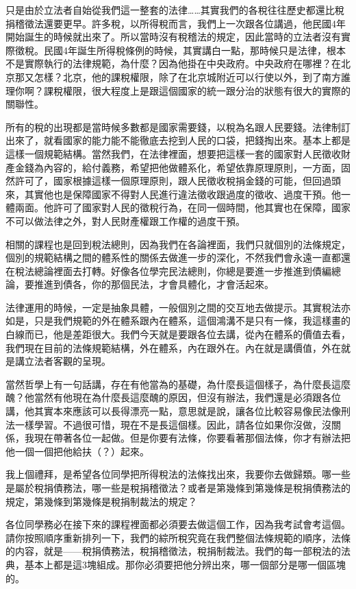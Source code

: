 \documentclass[oneside,sub3section]{ctexbook}
\begin{document}
只是由於立法者自始從我們這一整套的法律\ldots\ldots 其實我們的各稅往往歷史都還比稅捐稽徵法還要更早。許多稅，以所得稅而言，我們上一次跟各位講過，他民國4年開始誕生的時候就出來了。所以當時沒有稅稽法的規定，因此當時的立法者沒有實際徵稅。民國4年誕生所得稅條例的時候，其實講白一點，那時候只是法律，根本不是實際執行的法律規範，為什麼？因為他掛在中央政府。中央政府在哪裡？在北京那又怎樣？北京，他的課稅權限，除了在北京城附近可以行使以外，到了南方誰理你啊？課稅權限，很大程度上是跟這個國家的統一跟分治的狀態有很大的實際的關聯性。

所有的稅的出現都是當時候多數都是國家需要錢，以稅為名跟人民要錢。法律制訂出來了，就看國家的能力能不能徹底去挖到人民的口袋，把錢掏出來。基本上都是這樣一個規範結構。當然我們，在法律裡面，想要把這樣一套的國家對人民徵收財產金錢為內容的，給付義務，希望把他做體系化，希望依靠原理原則，一方面，固然許可了，國家根據這樣一個原理原則，跟人民徵收稅捐金錢的可能，但回過頭來，其實他也是保障國家不得對人民進行違法徵收跟過度的徵收、過度干預。他一體兩面。他許可了國家對人民的徵稅行為，在同一個時間，他其實也在保障，國家不可以做法律之外，對人民財產權跟工作權的過度干預。

相關的課程也是回到稅法總則，因為我們在各論裡面，我們只就個別的法條規定，個別的規範結構之間的體系性的關係去做進一步的深化，不然我們會永遠一直都還在稅法總論裡面去打轉。好像各位學完民法總則，你總是要進一步推進到債編總論，要推進到債各，你的那個民法，才會具體化，才會活起來。

法律運用的時候，一定是抽象具體，一般個別之間的交互地去做提示。其實稅法亦如是，只是我們規範的外在體系跟內在體系，這個鴻溝不是只有一條，我這樣畫的白線而已，他是差距很大。我們今天就是要跟各位去講，從內在體系的價值去看，我們現在目前的法條規範結構，外在體系，內在跟外在。內在就是講價值，外在就是講立法者客觀的呈現。

當然哲學上有一句話講，存在有他當為的基礎，為什麼長這個樣子，為什麼長這麼醜？他當然有他現在為什麼長這麼醜的原因，但沒有辦法，我們還是必須跟各位講，他其實本來應該可以長得漂亮一點，意思就是說，讓各位比較容易像民法像刑法一樣學習。不過很可惜，現在不是長這個樣。因此，請各位如果你沒做，沒關係，我現在帶著各位一起做。但是你要有法條，你要看著那個法條，你才有辦法把他一個一個把他給扶（？）起來。

我上個禮拜，是希望各位同學把所得稅法的法條找出來，我要你去做歸類。哪一些是屬於稅捐債務法，哪一些是稅捐稽徵法？或者是第幾條到第幾條是稅捐債務法的規定，第幾條到第幾條是稅捐制裁法的規定？

各位同學務必在接下來的課程裡面都必須要去做這個工作，因為我考試會考這個。請你按照順序重新排列一下，我們的綜所稅究竟在我們整個法條規範的順序，法條的内容，就是------稅捐債務法，稅捐稽徵法，稅捐制裁法。我們的每一部稅法的法典，基本上都是這3塊組成。那你必須要把他分辨出來，哪一個部分是哪一個區塊的。
\end{document}
